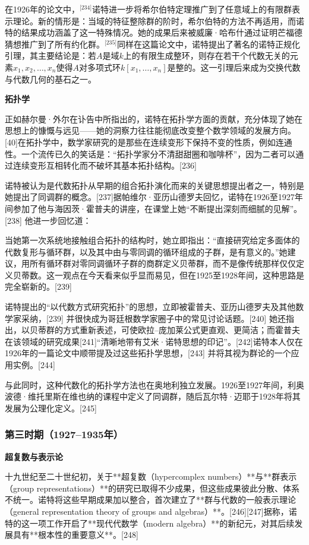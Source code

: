 在1926年的论文中，\(^\text{[234]}\)诺特进一步将希尔伯特定理推广到了任意域上的有限群表示理论。新的情形是：当域的特征整除群的阶时，希尔伯特的方法不再适用，而诺特的结果成功涵盖了这一特殊情况。她的成果后来被威廉·哈布什通过证明芒福德猜想推广到了所有约化群。\(^\text{[235]}\)同样在这篇论文中，诺特提出了著名的诺特正规化引理，其主要结论是：若$A$是域$k$上的有限生成整环，则存在若干个代数无关的元素${x_1, x_2, \ldots, x_n}$使得$A$对多项式环$k[x_1, \ldots, x_n]$是整的。这一引理后来成为交换代数与代数几何的基石之一。

\textbf{拓扑学}

正如赫尔曼·外尔在讣告中所指出的，诺特在拓扑学方面的贡献，充分体现了她在思想上的慷慨与远见——她的洞察力往往能彻底改变整个数学领域的发展方向。[40]在拓扑学中，数学家研究的是那些在连续变形下保持不变的性质，例如连通性。一个流传已久的笑话是：“拓扑学家分不清甜甜圈和咖啡杯”，因为二者可以通过连续变形互相转化而不破坏其基本拓扑结构。[236]

诺特被认为是代数拓扑从早期的组合拓扑演化而来的关键思想提出者之一，特别是她提出了同调群的概念。[237]据帕维尔·亚历山德罗夫回忆，诺特在1926至1927年间参加了他与海因茨·霍普夫的讲座，在课堂上她“不断提出深刻而细腻的见解”。[238] 他进一步回忆道：

当她第一次系统地接触组合拓扑的结构时，她立即指出：“直接研究给定多面体的代数复形与循环群，以及其中由与零同调的循环组成的子群，是有意义的。”她建议，用所有循环群对零同调循环子群的商群定义贝蒂群，而不是像传统那样仅仅定义贝蒂数。这一观点在今天看来似乎显而易见，但在1925至1928年间，这种思路是完全崭新的。[239]

诺特提出的“以代数方式研究拓扑”的思想，立即被霍普夫、亚历山德罗夫及其他数学家采纳，[239] 并很快成为哥廷根数学家圈子中的常见讨论话题。[240] 她还指出，以贝蒂群的方式重新表述，可使欧拉–庞加莱公式更直观、更简洁；而霍普夫在该领域的研究成果[241]“清晰地带有艾米·诺特思想的印记”。[242]诺特本人仅在1926年的一篇论文中顺带提及过这些拓扑学思想，[243] 并将其视为群论的一个应用实例。[244]

与此同时，这种代数化的拓扑学方法也在奥地利独立发展。1926至1927年间，利奥波德·维托里斯在维也纳的课程中定义了同调群，随后瓦尔特·迈耶于1928年将其发展为公理化定义。[245]
\subsubsection{第三时期（1927–1935年）}
\textbf{超复数与表示论}

十九世纪至二十世纪初，关于**超复数（hypercomplex numbers）**与**群表示（group representations）**的研究已取得不少成果，但这些成果彼此分散、体系不统一。诺特将这些早期成果加以整合，首次建立了**群与代数的一般表示理论（general representation theory of groups and algebras）**。[246][247]据称，诺特的这一项工作开启了**现代代数学（modern algebra）**的新纪元，对其后续发展具有**根本性的重要意义**。[248]

